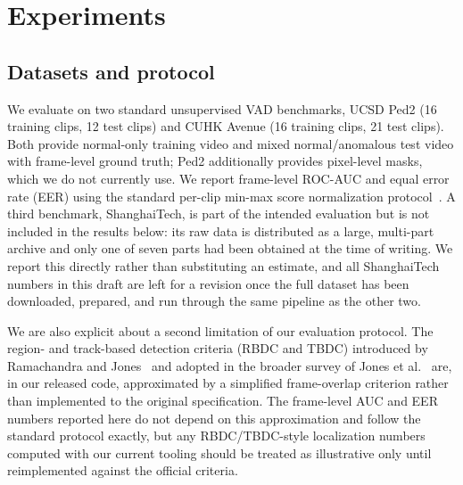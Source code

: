 \section{Experiments}
\label{sec:experiments}

\subsection{Datasets and protocol}
We evaluate on two standard unsupervised VAD benchmarks, UCSD Ped2 (16 training clips, 12 test clips) and CUHK Avenue (16 training clips, 21 test clips). Both provide normal-only training video and mixed normal/anomalous test video with frame-level ground truth; Ped2 additionally provides pixel-level masks, which we do not currently use. We report frame-level ROC-AUC and equal error rate (EER) using the standard per-clip min-max score normalization protocol~\cite{liu2018future}. A third benchmark, ShanghaiTech, is part of the intended evaluation but is not included in the results below: its raw data is distributed as a large, multi-part archive and only one of seven parts had been obtained at the time of writing. We report this directly rather than substituting an estimate, and all ShanghaiTech numbers in this draft are left for a revision once the full dataset has been downloaded, prepared, and run through the same pipeline as the other two.

We are also explicit about a second limitation of our evaluation protocol. The region- and track-based detection criteria (RBDC and TBDC) introduced by Ramachandra and Jones~\cite{ramachandra2020streetscene} and adopted in the broader survey of Jones et al.~\cite{jones2022survey} are, in our released code, approximated by a simplified frame-overlap criterion rather than implemented to the original specification. The frame-level AUC and EER numbers reported here do not depend on this approximation and follow the standard protocol exactly, but any RBDC/TBDC-style localization numbers computed with our current tooling should be treated as illustrative only until reimplemented against the official criteria.

